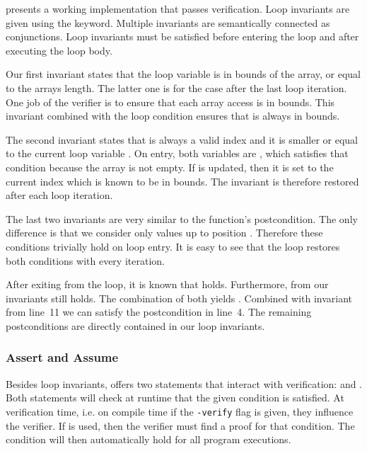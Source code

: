  presents a working implementation that passes verification.
Loop invariants are given using the  keyword.
Multiple invariants are semantically connected as conjunctions.
Loop invariants must be satisfied before entering the loop and after executing the loop body.

Our first invariant states that the loop variable  is in bounds of the  array, or equal to the arrays length.
The latter one is for the case after the last loop iteration.
One job of the verifier is to ensure that each array access is in bounds.
This invariant combined with the loop condition ensures that  is always in bounds.

The second invariant states that  is always a valid index and it is smaller or equal to the current loop variable .
On entry, both variables are , which satisfies that condition because the array is not empty.
If  is updated, then it is set to the current index which is known to be in bounds.
The invariant is therefore restored after each loop iteration.

The last two invariants are very similar to the function's postcondition.
The only difference is that we consider only values up to position .
Therefore these conditions trivially hold on loop entry.
It is easy to see that the loop restores both conditions with every iteration.

After exiting from the loop, it is known that  holds.
Furthermore,  from our invariants still holds.
The combination of both yields .
Combined with invariant from line~11 we can satisfy the postcondition in line~4.
The remaining postconditions are directly contained in our loop invariants.

\FloatBarrier

\subsubsection*{Assert and Assume}
Besides loop invariants, \whiley offers two statements that interact with verification:  and .
Both statements will check at runtime that the given condition is satisfied.
At verification time, i.e. on compile time if the \texttt{-verify} flag is given, they influence the verifier.
If  is used, then the verifier must find a proof for that condition.
The condition will then automatically hold for all program executions.

